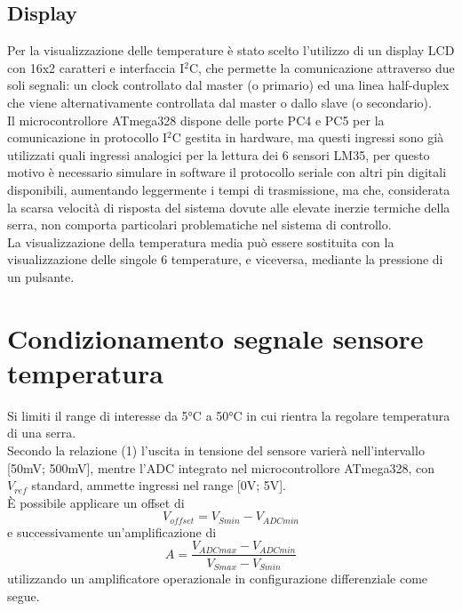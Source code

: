 \documentclass[12pt]{article}
\begin{document}
    \subsection{Display}
    Per la visualizzazione delle temperature è stato scelto l'utilizzo di un display LCD con 16x2 caratteri e interfaccia I$^2$C, che permette la comunicazione attraverso due soli se\-gna\-li: un clock controllato dal master (o primario) ed una linea half-duplex che viene alternativamente controllata dal master o dallo slave (o secondario).\\
    Il microcontrollore ATmega328 dispone delle porte PC4 e PC5 per la comunicazione in protocollo I$^2$C gestita in hardware, ma questi ingressi sono già utilizzati quali ingressi analogici per la lettura dei 6 sensori LM35, per questo motivo è necessario simulare in software il protocollo seriale con altri pin digitali disponibili, aumentando leggermente i tempi di trasmissione, ma che, considerata la scarsa velocità di risposta del sistema dovute alle elevate inerzie termiche della serra, non comporta particolari problematiche nel sistema di controllo.\\
    La visualizzazione della temperatura media può essere sostituita con la visualizzazione delle singole 6 temperature, e viceversa, mediante la pressione di un pulsante.

\vspace{1cm}

\section{Condizionamento segnale sensore temperatura}
    Si limiti il range di interesse da 5°C a 50°C in cui rientra la regolare temperatura di una serra.\\
    Secondo la relazione (1) l'uscita in tensione del sensore varierà nell'intervallo [50mV; 500mV], mentre l'ADC integrato nel microcontrollore ATmega328, con $V_{ref}$ standard, ammette ingressi nel range [0V; 5V].\\
        È possibile applicare un offset di 
        \begin{equation}
            {V_{offset}} = V_{Smin} - V_{ADCmin}
        \end{equation}
        e successivamente un'amplificazione di
        \begin{equation}
            A = \frac{V_{ADCmax}-V_{ADCmin}}{V_{Smax} - V_{Smin}}
        \end{equation}
        utilizzando un amplificatore operazionale in configurazione differenziale come segue.
\end{document}
